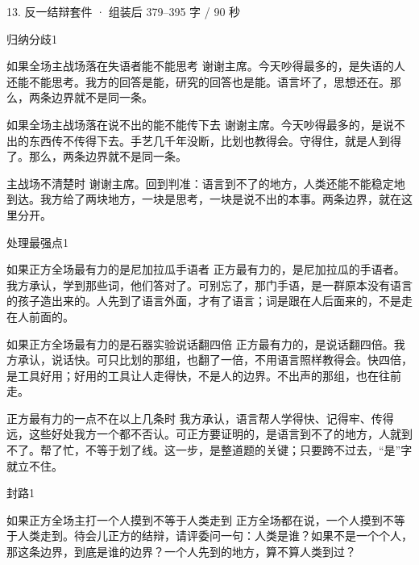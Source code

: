 \documentclass[script,con]{debate}
\begin{document}
\begin{kit}{13. 反一结辩}{套件 · 组装后 379–395 字 / 90 秒}
\begin{pick}{归纳分歧}{1}
\begin{module}{如果全场主战场落在失语者能不能思考}
谢谢主席。今天吵得最多的，是失语的人还能不能思考。我方的回答是能，研究的回答也是能。语言坏了，思想还在。那么，两条边界就不是同一条。
\end{module}
\begin{module}{如果全场主战场落在说不出的能不能传下去}
谢谢主席。今天吵得最多的，是说不出的东西传不传得下去。手艺几千年没断，比划也教得会。守得住，就是人到得了。那么，两条边界就不是同一条。
\end{module}
\begin{fallback}{主战场不清楚时}
谢谢主席。回到判准：语言到不了的地方，人类还能不能稳定地到达。我方给了两块地方，一块是思考，一块是说不出的本事。两条边界，就在这里分开。
\end{fallback}
\end{pick}
\begin{pick}{处理最强点}{1}
\begin{module}{如果正方全场最有力的是尼加拉瓜手语者}
正方最有力的，是尼加拉瓜的手语者。我方承认，学到那些词，他们答对了。可别忘了，那门手语，是一群原本没有语言的孩子造出来的。人先到了语言外面，才有了语言；词是跟在人后面来的，不是走在人前面的。
\end{module}
\begin{module}{如果正方全场最有力的是石器实验说话翻四倍}
正方最有力的，是说话翻四倍。我方承认，说话快。可只比划的那组，也翻了一倍，不用语言照样教得会。快四倍，是工具好用；好用的工具让人走得快，不是人的边界。不出声的那组，也在往前走。
\end{module}
\begin{fallback}{正方最有力的一点不在以上几条时}
我方承认，语言帮人学得快、记得牢、传得远，这些好处我方一个都不否认。可正方要证明的，是语言到不了的地方，人就到不了。帮了忙，不等于划了线。这一步，是整道题的关键；只要跨不过去，“是”字就立不住。
\end{fallback}
\end{pick}
\begin{pick}{封路}{1}
\begin{module}{如果正方全场主打一个人摸到不等于人类走到}
正方全场都在说，一个人摸到不等于人类走到。待会儿正方的结辩，请评委问一句：人类是谁？如果不是一个个人，那这条边界，到底是谁的边界？一个人先到的地方，算不算人类到过？
\end{module}

\end{pick}
\end{kit}
\end{document}
